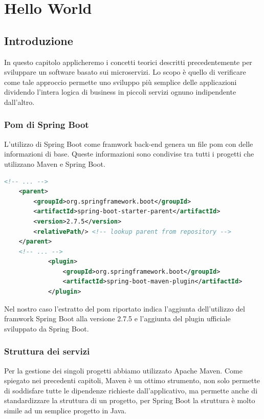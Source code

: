 \chapter{Hello World}

\section{Introduzione}
In questo capitolo applicheremo i concetti teorici descritti precedentemente per sviluppare un software basato sui microservizi. Lo scopo è quello di verificare come tale approccio permette uno sviluppo più semplice delle applicazioni dividendo l'intera logica di business in piccoli servizi ognuno indipendente dall'altro.


\subsection{Pom di Spring Boot}
L'utilizzo di Spring Boot come framwork back-end genera un file pom con delle informazioni di base. Queste informazioni sono condivise tra tutti i progetti che utilizzano Maven e Spring Boot.

\begin{lstlisting}[language=XML]
	<!-- ... -->
	<parent>
		<groupId>org.springframework.boot</groupId>
		<artifactId>spring-boot-starter-parent</artifactId>
		<version>2.7.5</version>
		<relativePath/> <!-- lookup parent from repository -->
	</parent>
	<!-- ... -->
			<plugin>
				<groupId>org.springframework.boot</groupId>
				<artifactId>spring-boot-maven-plugin</artifactId>
			</plugin>

\end{lstlisting}

Nel nostro caso l'estratto del pom riportato indica l'aggiunta dell'utilizzo del framwork Spring Boot alla versione 2.7.5 e l'aggiunta del plugin ufficiale sviluppato da Spring Boot.


\subsection{Struttura dei servizi}
Per la gestione dei singoli progetti abbiamo utilizzato Apache Maven. Come spiegato nei precedenti capitoli, Maven è un ottimo strumento, non solo permette di soddisfare tutte le dipendenze richieste dall'applicativo, ma permette anche di standardizzare la struttura di un progetto, per Spring Boot la struttura è molto simile ad un semplice progetto in Java. 


